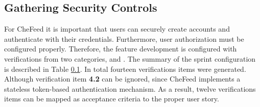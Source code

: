 \subsection{Gathering Security Controls}
For CheFeed it is important that users can securely create accounts and authenticate with their credentials. Furthermore, user authorization must be configured properly. Therefore, the feature development is configured with verifications from two categories,  and . The summary of the sprint configuration is described in Table \ref{}. In total fourteen verifications items were generated. Although verification item \textbf{4.2} can be ignored, since CheFeed implements a stateless token-based authentication mechanism. As a result, twelve verifications items can be mapped as acceptance criteria to the proper user story.

